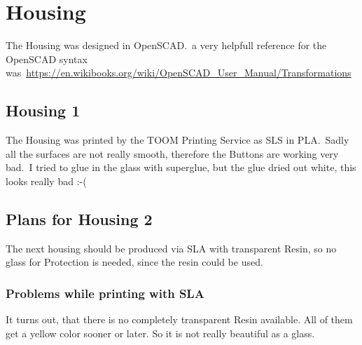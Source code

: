 \documentclass[12pt,a4paper,final]{article}
\begin{document}
\section{Housing}
The Housing was designed in OpenSCAD.\
a very helpfull reference for the OpenSCAD syntax was\
\url{https://en.wikibooks.org/wiki/OpenSCAD_User_Manual/Transformations}

\subsection{Housing 1}
The Housing was printed by the TOOM Printing Service as SLS in PLA.\
Sadly all the surfaces are not really smooth, therefore the Buttons are working very bad.\
I tried to glue in the glass with superglue, but the glue dried out white, this looks really bad :-(\

\subsection{Plans for Housing 2}
The next housing should be produced via SLA with transparent Resin, so no glass for Protection is needed, 
since the resin could be used.
\subsubsection{Problems while printing with SLA}
It turns out, that there is no completely transparent Resin available. All of them get a yellow color sooner or later.
So it is not really beautiful as a glass.
\end{document}
